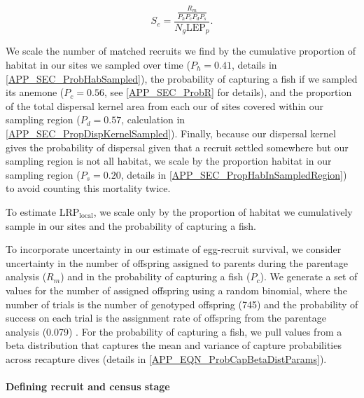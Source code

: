 \documentclass[12pt, oneside]{article}   	%
\begin{document}
\begin{equation}
S_e = \frac{\frac{R_m}{P_h P_c P_d P_s}}{N_g \text{LEP}_p}. \label{EQN_EggRecruitSurv}
\end{equation}

We scale the number of matched recruits we find by the cumulative proportion of habitat in our sites we sampled over time ($P_h = 0.41$, details in \ref{APP_SEC_ProbHabSampled}),
the probability of capturing a fish if we sampled its anemone ($P_c = 0.56$, see \ref{APP_SEC_ProbR} for details), and the proportion of the total dispersal kernel area from each our of sites covered within our sampling region ($P_d =0.57$, calculation in \ref{APP_SEC_PropDispKernelSampled}). Finally, because our dispersal kernel gives the probability of dispersal given that a recruit settled somewhere but our sampling region is not all habitat, we scale by the proportion habitat in our sampling region ($P_s = 0.20$, details in \ref{APP_SEC_PropHabInSampledRegion}) to avoid counting this mortality twice. 

To estimate $\text{LRP}_\text{local}$, we scale only by the proportion of habitat we cumulatively sample in our sites and the probability of capturing a fish.

To incorporate uncertainty in our estimate of egg-recruit survival, we consider uncertainty in the number of offspring assigned to parents during the parentage analysis ($R_m$) and in the probability of capturing a fish ($P_c$). We generate a set of values for the number of assigned offspring using a random binomial, where the number of trials is the number of genotyped offspring (745) and the probability of success on each trial is the assignment rate of offspring from the parentage analysis (0.079) \citep{catalanoInPrepconnectivity}. For the probability of capturing a fish, we pull values from a beta distribution that captures the mean and variance of capture probabilities across recapture dives (details in \ref{APP_EQN_ProbCapBetaDistParams}).

\paragraph*{Defining recruit and census stage} 
\end{document}
